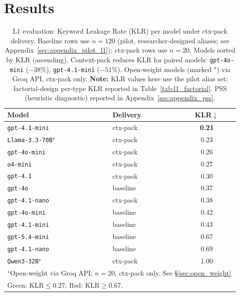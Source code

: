 \section{Results}
\label{sec:results}

\begin{table}[!t]
\centering
\caption{L1 evaluation: Keyword Leakage Rate (KLR) per model under ctx-pack delivery. Baseline rows use $n=120$ (pilot, researcher-designed aliases; see Appendix~\ref{sec:appendix_pilot_l1}); ctx-pack rows use $n=20$. Models sorted by KLR (ascending). Context-pack reduces KLR for paired models: \texttt{gpt-4o-mini} ($-38\%$), \texttt{gpt-4.1-mini} ($-51\%$). Open-weight models (marked $^\star$) via Groq API, ctx-pack only. \textbf{Note:} KLR values here use the pilot alias set; factorial-design per-type KLR reported in Table~\ref{tab:l1_factorial}. PSS (heuristic diagnostic) reported in Appendix~\ref{sec:appendix_pss}.}
\label{tab:l1_results}
\footnotesize
\begin{tabular}{@{}llc@{}}
\toprule
\textbf{Model} & \textbf{Delivery} & \textbf{KLR}$\downarrow$ \\
\midrule
\texttt{gpt-4.1-mini} & ctx-pack & \cellcolor{green!15}\textbf{0.21} \\
\texttt{Llama-3.3-70B}$^\star$ & ctx-pack & \cellcolor{green!15}0.23 \\
\texttt{gpt-4o-mini}  & ctx-pack & \cellcolor{green!15}0.26 \\
\texttt{o4-mini}      & ctx-pack & \cellcolor{green!15}0.27 \\
\texttt{gpt-4.1}      & ctx-pack & 0.30 \\
\texttt{gpt-4o}       & baseline & 0.37 \\
\texttt{gpt-4.1-nano} & ctx-pack & 0.38 \\
\texttt{gpt-4o-mini}  & baseline & 0.42 \\
\texttt{gpt-4.1-mini} & baseline & 0.43 \\
\texttt{gpt-5.4-mini} & baseline & \cellcolor{red!10}0.67 \\
\texttt{gpt-4.1-nano} & baseline & \cellcolor{red!10}0.69 \\
\texttt{Qwen3-32B}$^\star$ & ctx-pack & \cellcolor{red!10}1.00 \\
\bottomrule
\multicolumn{3}{l}{\scriptsize $^\star$Open-weight via Groq API; $n=20$, ctx-pack only. See \S\ref{sec:open_weight}.} \\
\multicolumn{3}{l}{\scriptsize \colorbox{green!15}{Green}: KLR${\leq}0.27$;\; \colorbox{red!10}{Red}: KLR${\geq}0.67$.} \\
\end{tabular}
\end{table}

